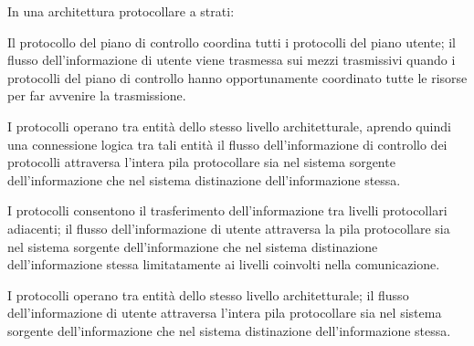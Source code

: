 \question
In una architettura protocollare a strati:

\begin{checkboxes}
	\choice Il protocollo del piano di controllo coordina tutti i protocolli del piano utente; %
	il flusso dell'informazione di utente viene trasmessa sui mezzi trasmissivi quando i protocolli del piano di controllo hanno opportunamente coordinato tutte le risorse per far avvenire la trasmissione.

	\choice I protocolli operano tra entità dello stesso livello architetturale, aprendo quindi una connessione logica tra tali entità il flusso dell'informazione di controllo dei protocolli attraversa l'intera pila protocollare sia nel sistema sorgente dell'informazione che nel sistema distinazione dell'informazione stessa.

	\choice I protocolli consentono il trasferimento dell'informazione tra livelli protocollari adiacenti; %
	il flusso dell'informazione di utente attraversa la pila protocollare sia nel sistema sorgente dell'informazione che nel sistema distinazione dell'informazione stessa limitatamente ai livelli coinvolti nella comunicazione.

	\CorrectChoice I protocolli operano tra entità dello stesso livello architetturale; %
	il flusso dell'informazione di utente attraversa l'intera pila protocollare sia nel sistema sorgente dell'informazione che nel sistema distinazione dell'informazione stessa.
\end{checkboxes}
